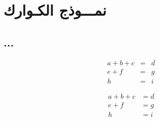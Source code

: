 \chapter{ نمـــوذج الكـوارك}

\label{Chapter5}


\section{...}

\begin{equation}
	\begin{array}{ccl}
		a + b + c & = & d \\
		e + f     & = & g \\
		h         & = & i
	\end{array}
\end{equation}

\begin{equation}
	\begin{aligned}
		a + b + c & =  d \\
		e + f     & =  g \\
		h         & =  i
	\end{aligned}
\end{equation}